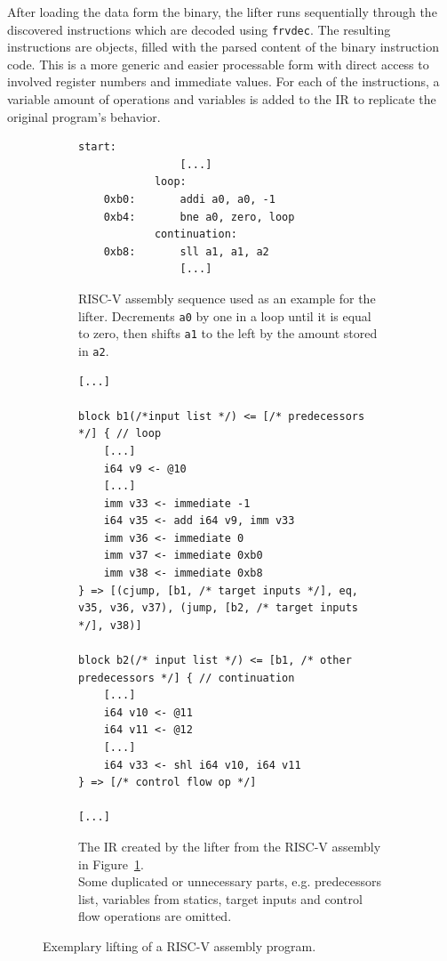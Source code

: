 \documentclass[course=eragp]{aspdoc}
\begin{document}
After loading the data form the binary, the lifter runs sequentially through the discovered
instructions which are decoded using \texttt{frvdec}\cite{frvdec}. The resulting instructions are objects,
filled with the parsed content of the binary instruction code. This is a
more generic and easier processable form with direct access to involved register numbers and
immediate values. For each of the instructions, a variable amount of operations and variables is added to
the IR to replicate the original program's behavior.

\begin{figure}
    \begin{subfigure}{\textwidth}
        \centering
        \begin{lstlisting}[language={[RISC-V]Assembler}]
            start:
                [...]
            loop:
    0xb0:       addi a0, a0, -1
    0xb4:       bne a0, zero, loop
            continuation:
    0xb8:       sll a1, a1, a2
                [...]
        \end{lstlisting}
\caption{RISC-V assembly sequence used as an example for the lifter. Decrements \texttt{a0} by one
in a loop until it is equal to zero,
            then shifts \texttt{a1} to the left by the amount stored in \texttt{a2}.}\label{fig:lifting_example_riscv}
        \vspace{1em}
    \end{subfigure}
    \begin{subfigure}{\textwidth}
        \centering
        \begin{lstlisting}
[...]

block b1(/*input list */) <= [/* predecessors */] { // loop
    [...]
    i64 v9 <- @10
    [...]
    imm v33 <- immediate -1
    i64 v35 <- add i64 v9, imm v33
    imm v36 <- immediate 0
    imm v37 <- immediate 0xb0
    imm v38 <- immediate 0xb8
} => [(cjump, [b1, /* target inputs */], eq, v35, v36, v37), (jump, [b2, /* target inputs */], v38)]

block b2(/* input list */) <= [b1, /* other predecessors */] { // continuation
    [...]
    i64 v10 <- @11
    i64 v11 <- @12
    [...]
    i64 v33 <- shl i64 v10, i64 v11
} => [/* control flow op */]

[...]
    \end{lstlisting}
        \caption{The IR created by the lifter from the RISC-V assembly in Figure~\ref{fig:lifting_example_riscv}. \\
            Some duplicated or unnecessary parts, e.g. predecessors list, variables from statics, target
            inputs and control flow operations are omitted.}\label{fig:lifting_example_ir}
    \end{subfigure}
    \caption{Exemplary lifting of a RISC-V assembly program.}
\end{figure}
\end{document}

